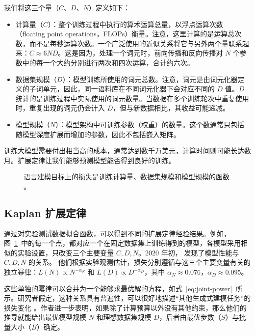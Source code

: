 我们将这三个量（$C$、$D$、$N$）定义如下：
\begin{itemize}
    \item 计算量（$C$）：整个训练过程中执行的算术运算总量，以浮点运算次数（floating point operations，FLOPs）衡量。注意，这里计算的是运算总次数，而不是每秒运算次数。一个广泛使用的近似关系将它与另外两个量联系起来：$C \approx 6ND$。这是因为，处理一个词元时，前向传播和反向传播对 $N$ 个参数中的每一个大约分别进行两次和四次运算，合计约六次。
    \item 数据集规模（$D$）：模型训练所使用的词元总数。注意，词元是由词元化器定义的子词单元，因此，同一语料库在不同词元化器下会对应不同的 $D$ 值。$D$ 统计的是训练过程中实际使用的词元数量。当数据在多个训练轮次中重复使用时，重复出现的词元仍会计入 $D$，但与新数据相比，其收益可能递减。
    \item 模型规模（$N$）：模型架构中可训练参数（权重）的数量。这个数通常只包括随模型深度扩展而增加的参数，因此不包括嵌入矩阵。
\end{itemize}
训练大模型需要付出相当高的成本，通常达到数千万美元，计算时间则可能长达数月。扩展定律让我们能够预测模型能否得到良好的训练。

\begin{figure}[t]
    \centering
    
    \caption{语言建模目标上的损失是训练计算量、数据集规模和模型规模的函数 \citep{kaplan2020scalinglawsneurallanguage}。}
    \label{fig:scaling-law}
\end{figure}

\subsection{Kaplan 扩展定律}
通过对实验测试数据拟合函数，可以得到不同的扩展定律经验结果。例如，图~\ref{fig:scaling-law}~中的每一个点，都对应一个在固定数据集上训练得到的模型，各模型采用相似的实验设置，只改变三个主要变量 $C,D,N$。2020 年初，\citet{kaplan2020scalinglawsneurallanguage} 发现了模型性能与 $C,D,N$ 的关系。
他们根据实验观测估计，损失分别遵循与这三个主要变量有关的独立幂律：$L(N) \propto N^{-\alpha_N}$ 和 $L(D) \propto D^{-\alpha_D}$，其中 $\alpha_N \approx 0.076$，$\alpha_D \approx 0.095$。

这些单独的幂律可以合并为一个能够求最优解的方程，如式~\ref{eq:joint-power}~所示。研究者假定，这种关系具有普遍性，可以很好地描述“其他生成式建模任务”的损失变化 \citep[p. 5]{kaplan2020scalinglawsneurallanguage}。作者进一步表明，如果除了计算预算以外没有其他约束，那么他们的推导就能给出最优模型规模 $N$ 和理想数据集规模 $D$，后者由最优步数（$S$）与批量大小（$B$）确定。

